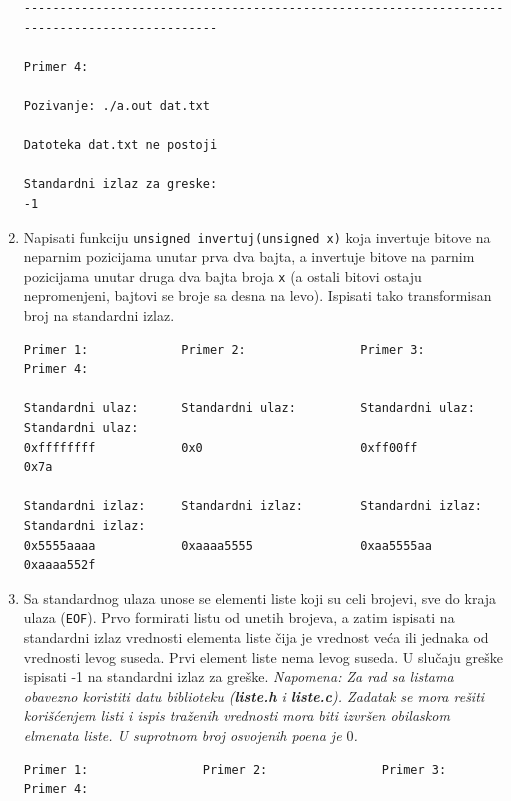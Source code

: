 \begin{enumerate}
\begin{verbatim}
----------------------------------------------------------------------------------------------

Primer 4:  
                                           
Pozivanje: ./a.out dat.txt              
                        
Datoteka dat.txt ne postoji
                            
Standardni izlaz za greske: 
-1                                                                                                                                        
\end{verbatim}

\item Napisati funkciju \texttt{unsigned invertuj(unsigned x)} koja invertuje bitove na neparnim pozicijama unutar prva dva bajta, a invertuje bitove na parnim pozicijama unutar druga dva bajta broja \texttt{x} (a ostali bitovi ostaju nepromenjeni, bajtovi se broje sa desna na levo). Ispisati tako transformisan broj na standardni izlaz.

\begin{verbatim}
Primer 1:             Primer 2:                Primer 3:               Primer 4:

Standardni ulaz:      Standardni ulaz:         Standardni ulaz:        Standardni ulaz:
0xffffffff            0x0                      0xff00ff                0x7a

Standardni izlaz:     Standardni izlaz:        Standardni izlaz:       Standardni izlaz:
0x5555aaaa            0xaaaa5555               0xaa5555aa              0xaaaa552f
\end{verbatim}  


\item Sa standardnog ulaza unose se elementi liste koji su celi brojevi, sve do kraja ulaza (\texttt{EOF}). Prvo formirati listu od unetih brojeva, a zatim ispisati na standardni izlaz vrednosti elementa liste čija je vrednost veća ili jednaka od vrednosti levog suseda. Prvi element liste nema levog suseda. U slučaju greške ispisati -1 na standardni izlaz za greške. \textit{Napomena: Za rad sa listama obavezno koristiti datu biblioteku (\textbf{liste.h} i \textbf{liste.c}). Zadatak se mora rešiti korišćenjem listi i ispis traženih vrednosti mora biti izvršen obilaskom elmenata liste. U suprotnom broj osvojenih poena je $0$.}

\begin{verbatim}
Primer 1:                Primer 2:                Primer 3:                Primer 4:        


\end{verbatim}
\end{enumerate}
